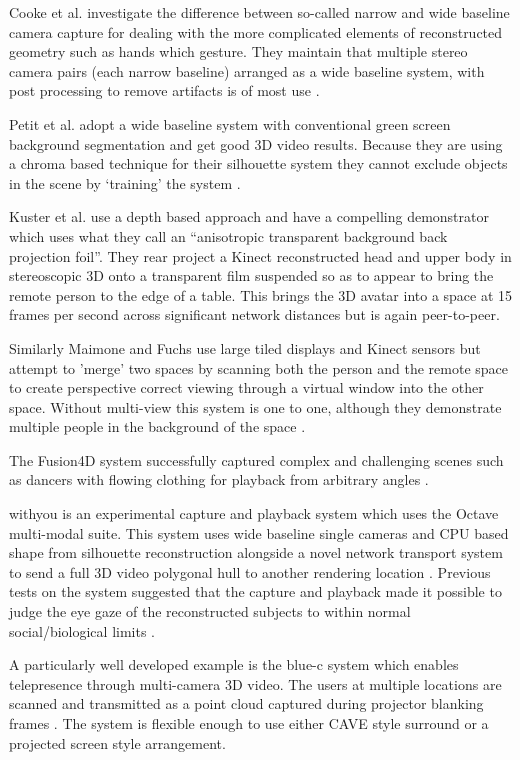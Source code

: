     
                        Cooke et al. investigate the difference between so-called narrow and wide baseline camera capture for dealing with the more complicated elements of reconstructed geometry such as hands which gesture. They maintain that multiple stereo camera pairs (each narrow baseline) arranged as a wide baseline system, with post processing to remove artifacts is of most use \cite{Cooke_image-basedrendering}.\par
                        Petit et al. adopt a wide baseline system with conventional green screen background segmentation and get good 3D video results. Because they are using a chroma based technique for their silhouette system they cannot exclude objects in the scene by `training' the system \cite{Petit2010}.\par
Kuster et al. use a depth based approach and have a compelling demonstrator which uses what they call an ``anisotropic transparent background back projection foil''. They rear project a Kinect reconstructed head and upper body in stereoscopic 3D onto a transparent film suspended so as to appear to bring the remote person to the edge of a table. This brings the 3D avatar into a space at 15 frames per second across significant network distances but is again peer-to-peer\cite{Kuster2012a}.\par
Similarly Maimone and Fuchs use large tiled displays and Kinect sensors but attempt to 'merge' two spaces by scanning both the person and the remote space to create perspective correct viewing through a virtual window into the other space. Without multi-view this system is one to one, although they demonstrate multiple people in the background of the space \cite{Maimone2011a}.\par
       The Fusion4D system successfully captured complex and challenging scenes such as dancers with flowing clothing for playback from arbitrary angles \cite{Dou2016}.\par
withyou is an experimental capture and playback system which uses the Octave multi-modal suite. This system uses wide baseline single cameras and CPU based shape from silhouette reconstruction alongside a novel network transport system to send a full 3D video polygonal hull to another rendering location \cite{Roberts2015}. Previous tests on the system suggested that the capture and playback made it possible to judge the eye gaze of the reconstructed subjects to within normal social/biological limits \cite{Roberts2013}.\par
A particularly well developed example is the blue-c system which enables telepresence through multi-camera 3D video. The users at multiple locations are scanned and transmitted as a point cloud captured during projector blanking frames \cite{Gross2003}. The system is flexible enough to use either CAVE style surround or a projected screen style arrangement.\par

